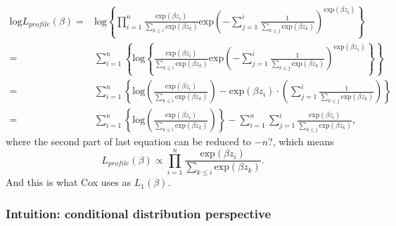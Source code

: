\documentclass[a4paper,12pt]{article}
\begin{document}
\begin{equation}
  \label{eq:profile_loglikelihood}
  \begin{aligned}
    \mathrm{log}L_{profile}\left(\beta\right) =&
    \mathrm{log}\left\{
      \prod\limits_{i = 1}^n
      \frac{\mathrm{exp}\left(\beta z_i\right)}{
        \sum\limits_{k \leq i}\mathrm{exp}\left(\beta z_k\right)
      }
      \mathrm{exp}\left(
        - \sum\limits_{j = 1}^i
        \frac{1}{\sum\limits_{k \leq j}\mathrm{exp}\left(\beta z_k\right)}
      \right)^{\mathrm{exp}\left(\beta z_i\right)}
    \right\}    \\
    =& \sum\limits_{i = 1}^n\left\{
      \mathrm{log}\left\{
        \frac{\mathrm{exp}\left(\beta z_i\right)}{
          \sum\limits_{k \leq i}\mathrm{exp}\left(\beta z_k\right)
        }
        \mathrm{exp}\left(
          - \sum\limits_{j = 1}^i
          \frac{1}{\sum\limits_{k \leq j}\mathrm{exp}\left(\beta z_k\right)}
        \right)^{\mathrm{exp}\left(\beta z_i\right)}
      \right\}
    \right\}    \\
    =& \sum\limits_{i = 1}^n\left\{
      \mathrm{log}\left(
        \frac{\mathrm{exp}\left(\beta z_i\right)}{
          \sum\limits_{k \leq i}\mathrm{exp}\left(\beta z_k\right)
        }
      \right)
      - \mathrm{exp}\left(\beta z_i\right)
      \cdot
      \left(
        \sum\limits_{j = 1}^i
        \frac{1}{\sum\limits_{k \leq j}\mathrm{exp}\left(\beta z_k\right)}
      \right)
    \right\}    \\
    =& \sum\limits_{i = 1}^n\left\{
      \mathrm{log}\left(
        \frac{\mathrm{exp}\left(\beta z_i\right)}{
          \sum\limits_{k \leq i}\mathrm{exp}\left(\beta z_k\right)
        }
      \right)\right\}
      - \sum\limits_{i = 1}^n
        \sum\limits_{j = 1}^i
        \frac{\mathrm{exp}\left(\beta z_i\right)}{\sum\limits_{k \leq j}\mathrm{exp}\left(\beta z_k\right)}
        ,
  \end{aligned}
\end{equation}
where the second part of last equation can be reduced to {\color{red}$-n$?}, which means
\[
  L_{profile}\left(\beta\right)
  \propto \prod\limits_{i = 1}^n
  \frac{\mathrm{exp}\left(\beta z_i\right)}{
    \sum\limits_{k \leq i}\mathrm{exp}\left(\beta z_k\right)
  }
  .
\]
And this is what Cox uses as $L_1\left(\beta\right)$.

\subsubsection{Intuition: conditional distribution perspective}
\label{sec:cond-distr-persp}
\end{document}
